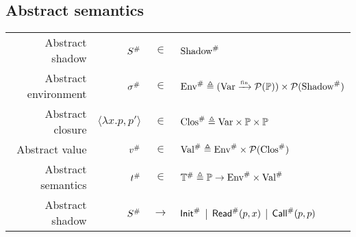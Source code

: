 \subsection{Abstract semantics}
\begin{center}
  \begin{tabular}{rrcl}
    Abstract shadow      & ${S}^{\#}$                 & $\in$         & ${\textnormal{Shadow}}^{\#}$                                                                     \\
    Abstract environment & ${\sigma}^{\#}$                   & $\in$         & ${\textnormal{Env}}^{\#}\triangleq({\textnormal{Var}}\xrightarrow{\mbox{\tiny{fin}}}{\mathcal{P}({\mathbb{P})})}\times\mathcal{P}({{\textnormal{Shadow}}^{\#}})$ \\
    Abstract closure     & $\langle\lambda x.p,p'\rangle$ & $\in$         & ${\textnormal{Clos}}^{\#}\triangleq\textnormal{Var}\times\mathbb{P}\times\mathbb{P}$        \\
    Abstract value       & ${v}^{\#}$                      & $\in$         & ${\textnormal{Val}}^{\#}\triangleq{\textnormal{Env}}^{\#}\times\mathcal{P}({{\textnormal{Clos}}^{\#}})$             \\
    Abstract semantics   & ${t}^{\#}$                   & $\in$         & ${\mathbb{T}}^{\#}\triangleq\mathbb{P}\rightarrow{\textnormal{Env}}^{\#}\times{\textnormal{Val}}^{\#}$      \\
    Abstract shadow      & ${S}^{\#}$                 & $\rightarrow$ & ${\mathsf{Init}}^{\#}$ | ${\mathsf{Read}}^{\#}(p,x)$ | ${\mathsf{Call}}^{\#}(p,p)$
  \end{tabular}
\end{center}
